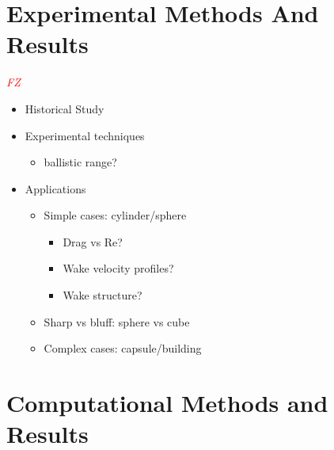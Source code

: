 \documentclass[journal]{new-aiaa}
\begin{document}
\section{Experimental Methods And Results} \label{sec:experimentalmethods}

\textcolor{red}{\emph{FZ}}

\begin{itemize}
    \item Historical Study
    \item Experimental techniques
    \begin{itemize}
        \item ballistic range?
    \end{itemize}
    \item Applications
    \begin{itemize}
        \item Simple cases: cylinder/sphere
        \begin{itemize}
            \item Drag vs Re?
            \item Wake velocity profiles?
            \item Wake structure?
        \end{itemize}
        \item Sharp vs bluff: sphere vs cube
        \item Complex cases: capsule/building
    \end{itemize}
\end{itemize}






















\section{Computational Methods and Results} \label{sec:computationalmethods}
\end{document}
